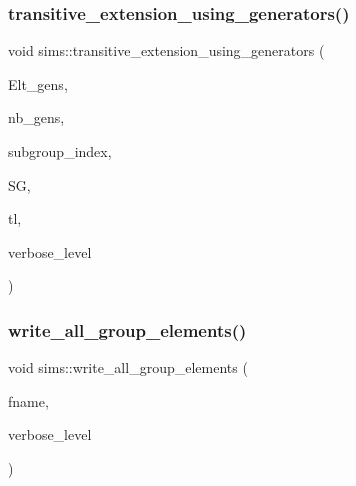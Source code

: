 \subsubsection{\texorpdfstring{transitive\+\_\+extension\+\_\+using\+\_\+generators()}{transitive\_extension\_using\_generators()}}
{\footnotesize\ttfamily void sims\+::transitive\+\_\+extension\+\_\+using\+\_\+generators (\begin{DoxyParamCaption}\item[{\mbox{\hyperlink{galois_8h_a09fddde158a3a20bd2dcadb609de11dc}{I\+NT}} $\ast$}]{Elt\+\_\+gens,  }\item[{\mbox{\hyperlink{galois_8h_a09fddde158a3a20bd2dcadb609de11dc}{I\+NT}}}]{nb\+\_\+gens,  }\item[{\mbox{\hyperlink{galois_8h_a09fddde158a3a20bd2dcadb609de11dc}{I\+NT}}}]{subgroup\+\_\+index,  }\item[{\mbox{\hyperlink{classvector__ge}{vector\+\_\+ge}} \&}]{SG,  }\item[{\mbox{\hyperlink{galois_8h_a09fddde158a3a20bd2dcadb609de11dc}{I\+NT}} $\ast$}]{tl,  }\item[{\mbox{\hyperlink{galois_8h_a09fddde158a3a20bd2dcadb609de11dc}{I\+NT}}}]{verbose\+\_\+level }\end{DoxyParamCaption})}

\mbox{\label{classsims_ace25b785e118af45ce824503c303d03b}} 
\subsubsection{\texorpdfstring{write\+\_\+all\+\_\+group\+\_\+elements()}{write\_all\_group\_elements()}}
{\footnotesize\ttfamily void sims\+::write\+\_\+all\+\_\+group\+\_\+elements (\begin{DoxyParamCaption}\item[{\mbox{\hyperlink{galois_8h_ab6cc7b4aeb6ea31aba2b3fbfc83ff5e6}{B\+Y\+TE}} $\ast$}]{fname,  }\item[{\mbox{\hyperlink{galois_8h_a09fddde158a3a20bd2dcadb609de11dc}{I\+NT}}}]{verbose\+\_\+level }\end{DoxyParamCaption})}

\mbox{\label{classsims_a6621d6ec45449ab1aa7bed5d72e5a829}} 
